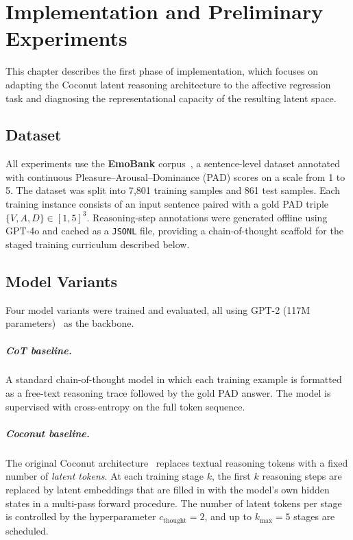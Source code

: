 \documentclass[12pt,twoside]{report}
\begin{document}



\clearpage{\pagestyle{empty}\cleardoublepage}
\setcounter{page}{1}
\pagestyle{fancy}
 
\chapter{Implementation and Preliminary Experiments}

This chapter describes the first phase of implementation, which focuses on adapting the Coconut latent reasoning architecture to the affective regression task and diagnosing the representational capacity of the resulting latent space.

\section{Dataset}

All experiments use the \textbf{EmoBank} corpus~\cite{buechel-hahn-2017-emobank}, a sentence-level dataset annotated with continuous Pleasure--Arousal--Dominance (PAD) scores on a scale from 1 to 5.
The dataset was split into 7{,}801 training samples and 861 test samples.
Each training instance consists of an input sentence paired with a gold PAD triple $\{V, A, D\} \in [1,5]^3$.
Reasoning-step annotations were generated offline using GPT-4o and cached as a \texttt{JSONL} file, providing a chain-of-thought scaffold for the staged training curriculum described below.

\section{Model Variants}

Four model variants were trained and evaluated, all using GPT-2 (117M parameters)~\cite{radford2019language} as the backbone.

\paragraph{CoT baseline.}
A standard chain-of-thought model in which each training example is formatted as a free-text reasoning trace followed by the gold PAD answer.
The model is supervised with cross-entropy on the full token sequence.

\paragraph{Coconut baseline.}
The original Coconut architecture~\cite{hao2025traininglargelanguagemodels} replaces textual reasoning tokens with a fixed number of \emph{latent tokens}.
At each training stage $k$, the first $k$ reasoning steps are replaced by latent embeddings that are filled in with the model's own hidden states in a multi-pass forward procedure.
The number of latent tokens per stage is controlled by the hyperparameter $c_{\text{thought}} = 2$, and up to $k_{\max} = 5$ stages are scheduled.
\end{document}
